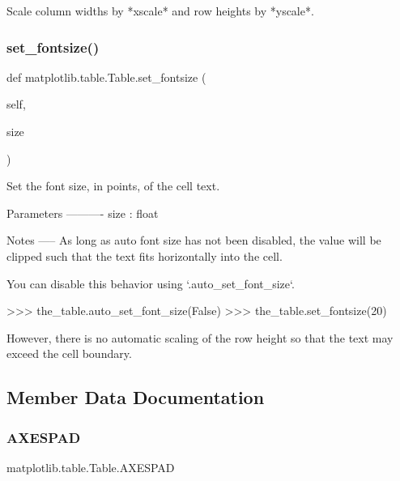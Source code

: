 \begin{DoxyVerb}Scale column widths by *xscale* and row heights by *yscale*.\end{DoxyVerb}
 \mbox{\label{classmatplotlib_1_1table_1_1Table_aec049ca1e0ec6c296d57c22600a391fc}} 
\subsubsection{\texorpdfstring{set\+\_\+fontsize()}{set\_fontsize()}}
{\footnotesize\ttfamily def matplotlib.\+table.\+Table.\+set\+\_\+fontsize (\begin{DoxyParamCaption}\item[{}]{self,  }\item[{}]{size }\end{DoxyParamCaption})}

\begin{DoxyVerb}Set the font size, in points, of the cell text.

Parameters
----------
size : float

Notes
-----
As long as auto font size has not been disabled, the value will be
clipped such that the text fits horizontally into the cell.

You can disable this behavior using `.auto_set_font_size`.

>>> the_table.auto_set_font_size(False)
>>> the_table.set_fontsize(20)

However, there is no automatic scaling of the row height so that the
text may exceed the cell boundary.
\end{DoxyVerb}
 

\subsection{Member Data Documentation}
\mbox{\label{classmatplotlib_1_1table_1_1Table_a8f80e5c1118faf3f1a3189ceb34a8953}} 
\subsubsection{\texorpdfstring{A\+X\+E\+S\+P\+AD}{AXESPAD}}
{\footnotesize\ttfamily matplotlib.\+table.\+Table.\+A\+X\+E\+S\+P\+AD\hspace{0.3cm}{\ttfamily [static]}}


